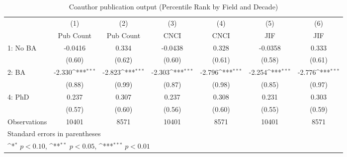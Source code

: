 \begin{table}[htbp]\centering
\def\sym#1{\ifmmode^{#1}\else\(^{#1}\)\fi}
\caption{Coauthor publication output (Percentile Rank by Field and Decade)}
\begin{tabular}{l*{6}{c}}
\hline\hline
                    &\multicolumn{1}{c}{(1)}&\multicolumn{1}{c}{(2)}&\multicolumn{1}{c}{(3)}&\multicolumn{1}{c}{(4)}&\multicolumn{1}{c}{(5)}&\multicolumn{1}{c}{(6)}\\
                    &\multicolumn{1}{c}{Pub Count}&\multicolumn{1}{c}{Pub Count}&\multicolumn{1}{c}{CNCI}&\multicolumn{1}{c}{CNCI}&\multicolumn{1}{c}{JIF}&\multicolumn{1}{c}{JIF}\\
\hline
1: No BA            &     -0.0416         &       0.334         &     -0.0438         &       0.328         &     -0.0358         &       0.333         \\
                    &      (0.60)         &      (0.62)         &      (0.60)         &      (0.61)         &      (0.58)         &      (0.61)         \\
[1em]
2: BA               &      -2.330\sym{***}&      -2.823\sym{***}&      -2.303\sym{***}&      -2.796\sym{***}&      -2.254\sym{***}&      -2.776\sym{***}\\
                    &      (0.88)         &      (0.99)         &      (0.87)         &      (0.98)         &      (0.85)         &      (0.97)         \\
[1em]
4: PhD              &       0.237         &       0.307         &       0.237         &       0.308         &       0.231         &       0.303         \\
                    &      (0.57)         &      (0.60)         &      (0.56)         &      (0.60)         &      (0.55)         &      (0.59)         \\
\hline
Observations        &       10401         &        8571         &       10401         &        8571         &       10401         &        8571         \\
\hline\hline
\multicolumn{7}{l}{\footnotesize Standard errors in parentheses}\\
\multicolumn{7}{l}{\footnotesize \sym{*} \(p<0.10\), \sym{**} \(p<0.05\), \sym{***} \(p<0.01\)}\\
\end{tabular}
\end{table}
